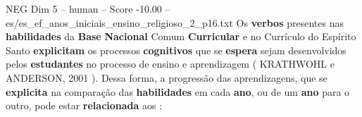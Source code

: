 \begin{textsample}{NEG Dim 5 – human – Score -10.00 – es/es\_ef\_anos\_iniciais\_ensino\_religioso\_2\_p16.txt}  \label{ex:f5_neg_011}
Os \textbf{verbos} presentes nas \textbf{habilidades} da \textbf{Base} \textbf{Nacional} Comum \textbf{Curricular} e no Currículo do Espírito Santo \textbf{explicitam} os processos \textbf{cognitivos} que se \textbf{espera} sejam desenvolvidos pelos \textbf{estudantes} no processo de ensino e aprendizagem ( KRATHWOHL e ANDERSON, 2001 ).
Dessa forma, a progressão das aprendizagens, que se \textbf{explicita} na comparação das \textbf{habilidades} em cada \textbf{ano}, ou de um \textbf{ano} para o outro, pode estar \textbf{relacionada} aos :

\end{textsample}
